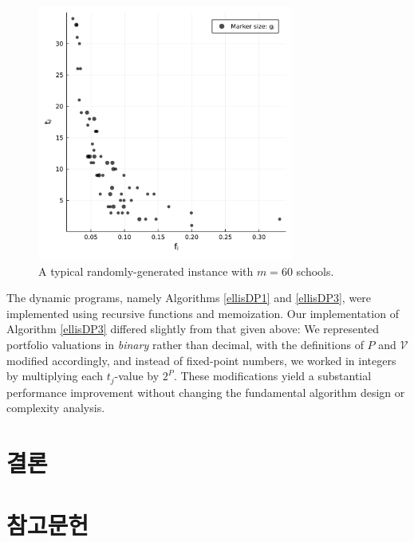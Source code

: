 \documentclass[12pt]{article} %
\newif\ifen
\theoremstyle{definition}
\theoremstyle{definition}
\begin{document}
\begin{figure}[h!]
  \begin{center}\includegraphics[width=0.75\textwidth]{./plots/samplemarket.pdf}\end{center}
  \caption{A typical randomly-generated instance with $m=60$ schools. }
\end{figure}

The dynamic programs, namely Algorithms \ref{ellisDP1} and \ref{ellisDP3}, were implemented using recursive functions and memoization. Our implementation of Algorithm \ref{ellisDP3} differed slightly from that given above: We represented portfolio valuations in \emph{binary} rather than decimal, with the definitions of $P$ and $\mathcal{V}$ modified accordingly, and instead of fixed-point numbers, we worked in integers by multiplying each $t_j$-value by $2^P$. These modifications yield a substantial performance improvement without changing the fundamental algorithm design or complexity analysis. 



\pagebreak
\ifen \section{Conclusion} \else \section{결론}\fi\label{conclusion}


\pagebreak
\ifen \section{References} \else \section{참고문헌} \fi
\noindent
\end{document}

